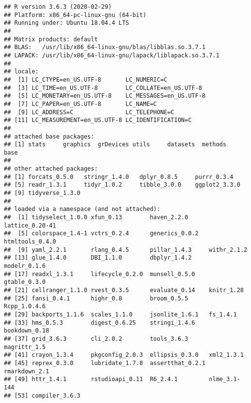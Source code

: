 \documentclass[]{bxjsarticle}
\begin{document}
\begin{verbatim}
## R version 3.6.3 (2020-02-29)
## Platform: x86_64-pc-linux-gnu (64-bit)
## Running under: Ubuntu 18.04.4 LTS
## 
## Matrix products: default
## BLAS:   /usr/lib/x86_64-linux-gnu/blas/libblas.so.3.7.1
## LAPACK: /usr/lib/x86_64-linux-gnu/lapack/liblapack.so.3.7.1
## 
## locale:
##  [1] LC_CTYPE=en_US.UTF-8       LC_NUMERIC=C              
##  [3] LC_TIME=en_US.UTF-8        LC_COLLATE=en_US.UTF-8    
##  [5] LC_MONETARY=en_US.UTF-8    LC_MESSAGES=en_US.UTF-8   
##  [7] LC_PAPER=en_US.UTF-8       LC_NAME=C                 
##  [9] LC_ADDRESS=C               LC_TELEPHONE=C            
## [11] LC_MEASUREMENT=en_US.UTF-8 LC_IDENTIFICATION=C       
## 
## attached base packages:
## [1] stats     graphics  grDevices utils     datasets  methods   base     
## 
## other attached packages:
## [1] forcats_0.5.0   stringr_1.4.0   dplyr_0.8.5     purrr_0.3.4    
## [5] readr_1.3.1     tidyr_1.0.2     tibble_3.0.0    ggplot2_3.3.0  
## [9] tidyverse_1.3.0
## 
## loaded via a namespace (and not attached):
##  [1] tidyselect_1.0.0 xfun_0.13        haven_2.2.0      lattice_0.20-41 
##  [5] colorspace_1.4-1 vctrs_0.2.4      generics_0.0.2   htmltools_0.4.0 
##  [9] yaml_2.2.1       rlang_0.4.5      pillar_1.4.3     withr_2.1.2     
## [13] glue_1.4.0       DBI_1.1.0        dbplyr_1.4.2     modelr_0.1.6    
## [17] readxl_1.3.1     lifecycle_0.2.0  munsell_0.5.0    gtable_0.3.0    
## [21] cellranger_1.1.0 rvest_0.3.5      evaluate_0.14    knitr_1.28      
## [25] fansi_0.4.1      highr_0.8        broom_0.5.5      Rcpp_1.0.4.6    
## [29] backports_1.1.6  scales_1.1.0     jsonlite_1.6.1   fs_1.4.1        
## [33] hms_0.5.3        digest_0.6.25    stringi_1.4.6    bookdown_0.18   
## [37] grid_3.6.3       cli_2.0.2        tools_3.6.3      magrittr_1.5    
## [41] crayon_1.3.4     pkgconfig_2.0.3  ellipsis_0.3.0   xml2_1.3.1      
## [45] reprex_0.3.0     lubridate_1.7.8  assertthat_0.2.1 rmarkdown_2.1   
## [49] httr_1.4.1       rstudioapi_0.11  R6_2.4.1         nlme_3.1-144    
## [53] compiler_3.6.3
\end{verbatim}


\end{document}
